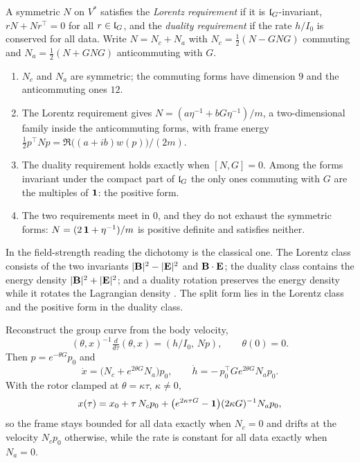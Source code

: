 \begin{definition}
\label{def:inertiareq}
A symmetric $N$ on $V^*$ satisfies the \emph{Lorentz requirement} if it is $\mathfrak l_G$-invariant, $rN+Nr^{\!\top}=0$ for all $r\in\mathfrak l_G$, and the
\emph{duality requirement} if the rate $h/I_0$ is conserved for all data. Write $N=N_c+N_a$ with $N_c=\tfrac12(N-GNG)$ commuting and
$N_a=\tfrac12(N+GNG)$ anticommuting with $G$.
\end{definition}

\begin{theorem}
\label{thm:inertiareq}
\begin{enumerate}[label=(\roman*),leftmargin=2.2em]
\item $N_c$ and $N_a$ are symmetric; the commuting forms have dimension $9$ and the anticommuting ones $12$.
\item The Lorentz requirement gives $N=(a\eta^{-1}+bG\eta^{-1})/m$, a two-dimensional family inside the anticommuting forms, with frame energy
$\tfrac12p^{\!\top}Np=\Re\bigl((a+ib)w(p)\bigr)/(2m)$.
\item The duality requirement holds exactly when $[N,G]=0$. Among the forms invariant under the compact part of $\mathfrak l_G$ the only ones commuting with
$G$ are the multiples of $\mathbf 1$: the positive form.
\item The two requirements meet in $0$, and they do not exhaust the symmetric forms: $N=(2\,\mathbf 1+\eta^{-1})/m$ is positive definite and satisfies
neither.
\end{enumerate}
\end{theorem}

In the field-strength reading the dichotomy is the classical one. The Lorentz class consists of the two invariants $|\mathbf B|^2-|\mathbf E|^2$ and
$\mathbf B\cdot\mathbf E$; the duality class contains the energy density $|\mathbf B|^2+|\mathbf E|^2$; and a duality rotation preserves the energy density while it
rotates the Lagrangian density \cite{Calkin65,DeserTeitelboim76,GaillardZumino81}. The split form lies in the Lorentz class and the positive form
in the duality class.

\begin{theorem}
\label{thm:drift}
Reconstruct the group curve from the body velocity,
\[
(\theta,x)^{-1}\tfrac{d}{d\tau}(\theta,x)=(h/I_0,\,Np),\qquad \theta(0)=0 .
\]
Then $p=e^{-\theta G}p_0$ and
\[
\dot x=\bigl(N_c+e^{2\theta G}N_a\bigr)p_0,\qquad \dot h=-\,p_0^{\!\top}Ge^{2\theta G}N_ap_0 .
\]
With the rotor clamped at $\theta=\kappa\tau$, $\kappa\neq0$,
\[
x(\tau)=x_0+\tau\,N_cp_0+\bigl(e^{2\kappa\tau G}-\mathbf 1\bigr)(2\kappa G)^{-1}N_ap_0 ,
\]
so the frame stays bounded for all data exactly when $N_c=0$ and drifts at the velocity $N_cp_0$ otherwise, while the rate is constant for all data
exactly when $N_a=0$.
\end{theorem}

